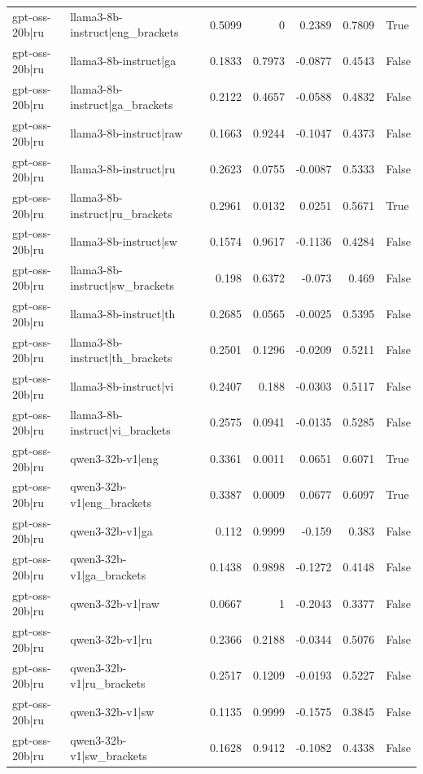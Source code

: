 \begin{table}
\begin{tabular}{l l r r r r l}
gpt-oss-20b|ru & llama3-8b-instruct|eng_brackets & 0.5099 & 0 & 0.2389 & 0.7809 & True \\
gpt-oss-20b|ru & llama3-8b-instruct|ga & 0.1833 & 0.7973 & -0.0877 & 0.4543 & False \\
gpt-oss-20b|ru & llama3-8b-instruct|ga_brackets & 0.2122 & 0.4657 & -0.0588 & 0.4832 & False \\
gpt-oss-20b|ru & llama3-8b-instruct|raw & 0.1663 & 0.9244 & -0.1047 & 0.4373 & False \\
gpt-oss-20b|ru & llama3-8b-instruct|ru & 0.2623 & 0.0755 & -0.0087 & 0.5333 & False \\
gpt-oss-20b|ru & llama3-8b-instruct|ru_brackets & 0.2961 & 0.0132 & 0.0251 & 0.5671 & True \\
gpt-oss-20b|ru & llama3-8b-instruct|sw & 0.1574 & 0.9617 & -0.1136 & 0.4284 & False \\
gpt-oss-20b|ru & llama3-8b-instruct|sw_brackets & 0.198 & 0.6372 & -0.073 & 0.469 & False \\
gpt-oss-20b|ru & llama3-8b-instruct|th & 0.2685 & 0.0565 & -0.0025 & 0.5395 & False \\
gpt-oss-20b|ru & llama3-8b-instruct|th_brackets & 0.2501 & 0.1296 & -0.0209 & 0.5211 & False \\
gpt-oss-20b|ru & llama3-8b-instruct|vi & 0.2407 & 0.188 & -0.0303 & 0.5117 & False \\
gpt-oss-20b|ru & llama3-8b-instruct|vi_brackets & 0.2575 & 0.0941 & -0.0135 & 0.5285 & False \\
gpt-oss-20b|ru & qwen3-32b-v1|eng & 0.3361 & 0.0011 & 0.0651 & 0.6071 & True \\
gpt-oss-20b|ru & qwen3-32b-v1|eng_brackets & 0.3387 & 0.0009 & 0.0677 & 0.6097 & True \\
gpt-oss-20b|ru & qwen3-32b-v1|ga & 0.112 & 0.9999 & -0.159 & 0.383 & False \\
gpt-oss-20b|ru & qwen3-32b-v1|ga_brackets & 0.1438 & 0.9898 & -0.1272 & 0.4148 & False \\
gpt-oss-20b|ru & qwen3-32b-v1|raw & 0.0667 & 1 & -0.2043 & 0.3377 & False \\
gpt-oss-20b|ru & qwen3-32b-v1|ru & 0.2366 & 0.2188 & -0.0344 & 0.5076 & False \\
gpt-oss-20b|ru & qwen3-32b-v1|ru_brackets & 0.2517 & 0.1209 & -0.0193 & 0.5227 & False \\
gpt-oss-20b|ru & qwen3-32b-v1|sw & 0.1135 & 0.9999 & -0.1575 & 0.3845 & False \\
gpt-oss-20b|ru & qwen3-32b-v1|sw_brackets & 0.1628 & 0.9412 & -0.1082 & 0.4338 & False \\

\end{tabular}
\end{table}
